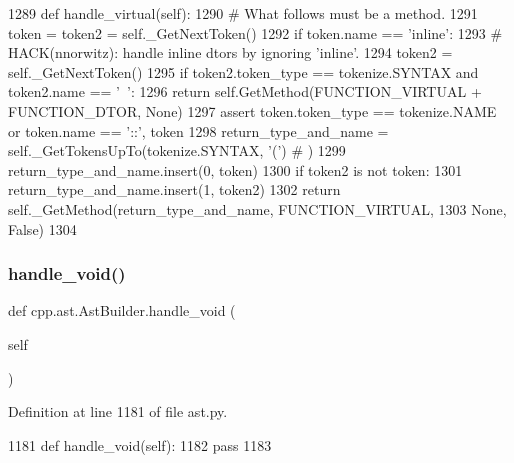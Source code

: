 \begin{DoxyCode}
1289     \textcolor{keyword}{def }handle\_virtual(self):
1290         \textcolor{comment}{# What follows must be a method.}
1291         token = token2 = self.\_GetNextToken()
1292         \textcolor{keywordflow}{if} token.name == \textcolor{stringliteral}{'inline'}:
1293             \textcolor{comment}{# HACK(nnorwitz): handle inline dtors by ignoring 'inline'.}
1294             token2 = self.\_GetNextToken()
1295         \textcolor{keywordflow}{if} token2.token\_type == tokenize.SYNTAX \textcolor{keywordflow}{and} token2.name == \textcolor{stringliteral}{'~'}:
1296             \textcolor{keywordflow}{return} self.GetMethod(FUNCTION\_VIRTUAL + FUNCTION\_DTOR, \textcolor{keywordtype}{None})
1297         \textcolor{keyword}{assert} token.token\_type == tokenize.NAME \textcolor{keywordflow}{or} token.name == \textcolor{stringliteral}{'::'}, token
1298         return\_type\_and\_name = self.\_GetTokensUpTo(tokenize.SYNTAX, \textcolor{stringliteral}{'('})  \textcolor{comment}{# )}
1299         return\_type\_and\_name.insert(0, token)
1300         \textcolor{keywordflow}{if} token2 \textcolor{keywordflow}{is} \textcolor{keywordflow}{not} token:
1301             return\_type\_and\_name.insert(1, token2)
1302         \textcolor{keywordflow}{return} self.\_GetMethod(return\_type\_and\_name, FUNCTION\_VIRTUAL,
1303                                \textcolor{keywordtype}{None}, \textcolor{keyword}{False})
1304 
\end{DoxyCode}
\mbox{\label{classcpp_1_1ast_1_1AstBuilder_a7a8f94909d4080bad2bc5dabd934057b}} 
\subsubsection{\texorpdfstring{handle\+\_\+void()}{handle\_void()}}
{\footnotesize\ttfamily def cpp.\+ast.\+Ast\+Builder.\+handle\+\_\+void (\begin{DoxyParamCaption}\item[{}]{self }\end{DoxyParamCaption})}



Definition at line 1181 of file ast.\+py.


\begin{DoxyCode}
1181     \textcolor{keyword}{def }handle\_void(self):
1182         \textcolor{keywordflow}{pass}
1183 
\end{DoxyCode}
\mbox{\label{classcpp_1_1ast_1_1AstBuilder_a2dfb23ddeb05e1017b3d1ce85a40cacb}} 
